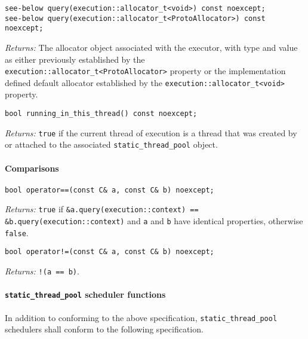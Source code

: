 \documentclass[a4paper,12pt,notitlepage,twoside,openright]{article}
\begin{document}
\begin{verbatim}
see-below query(execution::allocator_t<void>) const noexcept;
see-below query(execution::allocator_t<ProtoAllocator>) const noexcept;
\end{verbatim}

\emph{Returns:} The allocator object associated with the executor, with
type and value as either previously established by the
\texttt{execution::allocator_t<ProtoAllocator>} property or
the implementation defined default allocator established by the
\texttt{execution::allocator_t<void>} property.

\begin{verbatim}
bool running_in_this_thread() const noexcept;
\end{verbatim}

\emph{Returns:} \texttt{true} if the current thread of
execution is a thread that was created by or attached to the associated
\texttt{static_thread_pool} object.

\hypertarget{comparisons}{%
\paragraph{Comparisons}\label{comparisons}}

\begin{verbatim}
bool operator==(const C& a, const C& b) noexcept;
\end{verbatim}

\emph{Returns:} \texttt{true} if
\texttt{&a.query(execution::context) == &b.query(execution::context)}
and \texttt{a} and \texttt{b} have identical
properties, otherwise \texttt{false}.

\begin{verbatim}
bool operator!=(const C& a, const C& b) noexcept;
\end{verbatim}

\emph{Returns:} \texttt{!(a == b)}.

\hypertarget{static_thread_pool-scheduler-functions}{%
\paragraph{\texorpdfstring{\texttt{static_thread_pool}
scheduler
functions}{ scheduler functions}}\label{static_thread_pool-scheduler-functions}}

In addition to conforming to the above specification,
\texttt{static_thread_pool} schedulers shall conform to the
following specification.
\end{document}
